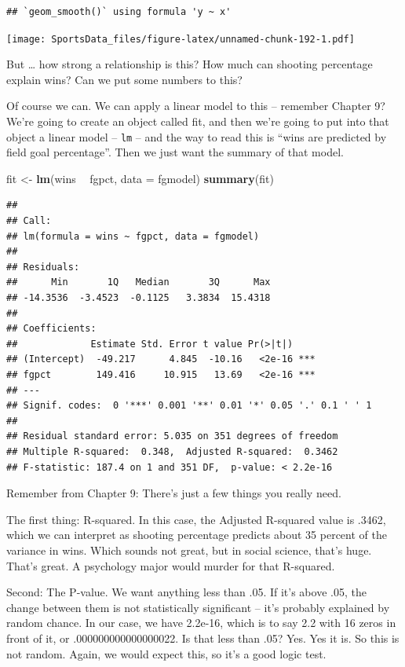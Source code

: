 \documentclass[
]{book}
\newenvironment{Shaded}{\begin{snugshade}}{\end{snugshade}}
\newcommand{\DataTypeTok}[1]{\textcolor[rgb]{0.13,0.29,0.53}{#1}}
\newcommand{\KeywordTok}[1]{\textcolor[rgb]{0.13,0.29,0.53}{\textbf{#1}}}
\newcommand{\NormalTok}[1]{#1}
\newcommand{\OperatorTok}[1]{\textcolor[rgb]{0.81,0.36,0.00}{\textbf{#1}}}
\newcommand{\StringTok}[1]{\textcolor[rgb]{0.31,0.60,0.02}{#1}}
\begin{document}
\begin{verbatim}
## `geom_smooth()` using formula 'y ~ x'
\end{verbatim}

\texttt{[image: SportsData\_files/figure-latex/unnamed-chunk-192-1.pdf]}

But \ldots{} how strong a relationship is this? How much can shooting percentage explain wins? Can we put some numbers to this?

Of course we can. We can apply a linear model to this -- remember Chapter 9? We're going to create an object called fit, and then we're going to put into that object a linear model -- \texttt{lm} -- and the way to read this is ``wins are predicted by field goal percentage''. Then we just want the summary of that model.

\begin{Shaded}
\begin{Highlighting}[]
\NormalTok{fit <-}\StringTok{ }\KeywordTok{lm}\NormalTok{(wins }\OperatorTok{~}\StringTok{ }\NormalTok{fgpct, }\DataTypeTok{data =}\NormalTok{ fgmodel)}
\KeywordTok{summary}\NormalTok{(fit)}
\end{Highlighting}
\end{Shaded}

\begin{verbatim}
## 
## Call:
## lm(formula = wins ~ fgpct, data = fgmodel)
## 
## Residuals:
##      Min       1Q   Median       3Q      Max 
## -14.3536  -3.4523  -0.1125   3.3834  15.4318 
## 
## Coefficients:
##             Estimate Std. Error t value Pr(>|t|)    
## (Intercept)  -49.217      4.845  -10.16   <2e-16 ***
## fgpct        149.416     10.915   13.69   <2e-16 ***
## ---
## Signif. codes:  0 '***' 0.001 '**' 0.01 '*' 0.05 '.' 0.1 ' ' 1
## 
## Residual standard error: 5.035 on 351 degrees of freedom
## Multiple R-squared:  0.348,	Adjusted R-squared:  0.3462 
## F-statistic: 187.4 on 1 and 351 DF,  p-value: < 2.2e-16
\end{verbatim}

Remember from Chapter 9: There's just a few things you really need.

The first thing: R-squared. In this case, the Adjusted R-squared value is .3462, which we can interpret as shooting percentage predicts about 35 percent of the variance in wins. Which sounds not great, but in social science, that's huge. That's great. A psychology major would murder for that R-squared.

Second: The P-value. We want anything less than .05. If it's above .05, the change between them is not statistically significant -- it's probably explained by random chance. In our case, we have 2.2e-16, which is to say 2.2 with 16 zeros in front of it, or .000000000000000022. Is that less than .05? Yes. Yes it is. So this is not random. Again, we would expect this, so it's a good logic test.
\end{document}
